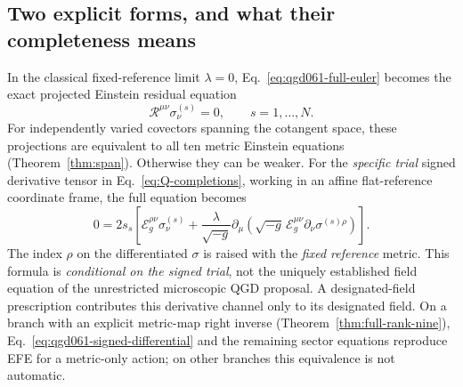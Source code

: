 \documentclass[11pt,a4paper]{article}
\begin{document}
\subsection{Two explicit forms, and what their completeness means}
In the classical fixed-reference limit $\lambda=0$, Eq.~\eqref{eq:qgd061-full-euler}
becomes the exact projected Einstein residual equation
\begin{equation}\label{eq:qgd061-projected-EFE}
\boxed{\mathcal R^{\mu\nu}\sigma^{(s)}_\nu=0,
\qquad s=1,\ldots,N.}
\end{equation}
For independently varied covectors spanning the cotangent space, these
projections are equivalent to all ten metric Einstein equations
(Theorem~\ref{thm:span}). Otherwise they can be weaker. For the
\emph{specific trial} signed derivative tensor in Eq.~\eqref{eq:Q-completions},
working in an affine flat-reference coordinate frame, the full equation becomes
\begin{equation}\label{eq:qgd061-signed-differential}
\boxed{0=2s_s\left[\mathcal E_g^{\rho\nu}\sigma_\nu^{(s)}
+\frac{\lambda}{\sqrt{-g}}\partial_\mu\left(
\sqrt{-g}\,\mathcal E_g^{\mu\nu}
\partial_\nu\sigma^{(s)\rho}\right)\right].}
\end{equation}
The index $\rho$ on the differentiated $\sigma$ is raised with the
\emph{fixed reference} metric. This formula is \emph{conditional on the signed
trial}, not the uniquely established field equation of the unrestricted
microscopic QGD proposal. A designated-field prescription contributes this
derivative channel only to its designated field. On a branch with an explicit
metric-map right inverse (Theorem~\ref{thm:full-rank-nine}), Eq.~\eqref{eq:qgd061-signed-differential}
and the remaining sector equations reproduce EFE for a metric-only action;
on other branches this equivalence is not automatic.
\end{document}
